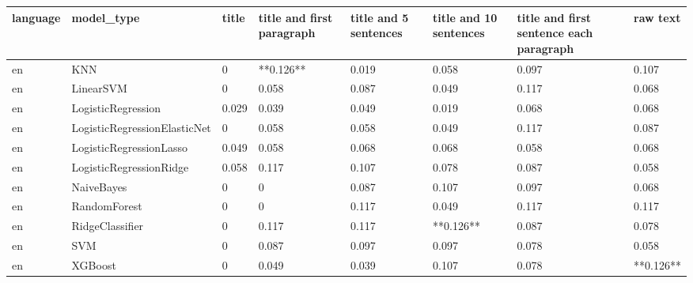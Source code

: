 \begin{tabular}{llllllll}
\toprule
language &                   model\_type & title & title and first paragraph & title and 5 sentences & title and 10 sentences & title and first sentence each paragraph &  raw text \\
\midrule
      en &                          KNN &     0 &                 **0.126** &                 0.019 &                  0.058 &                                   0.097 &     0.107 \\
      en &                    LinearSVM &     0 &                     0.058 &                 0.087 &                  0.049 &                                   0.117 &     0.068 \\
      en &           LogisticRegression & 0.029 &                     0.039 &                 0.049 &                  0.019 &                                   0.068 &     0.068 \\
      en & LogisticRegressionElasticNet &     0 &                     0.058 &                 0.058 &                  0.049 &                                   0.117 &     0.087 \\
      en &      LogisticRegressionLasso & 0.049 &                     0.058 &                 0.068 &                  0.068 &                                   0.058 &     0.068 \\
      en &      LogisticRegressionRidge & 0.058 &                     0.117 &                 0.107 &                  0.078 &                                   0.087 &     0.058 \\
      en &                   NaiveBayes &     0 &                         0 &                 0.087 &                  0.107 &                                   0.097 &     0.068 \\
      en &                 RandomForest &     0 &                         0 &                 0.117 &                  0.049 &                                   0.117 &     0.117 \\
      en &              RidgeClassifier &     0 &                     0.117 &                 0.117 &              **0.126** &                                   0.087 &     0.078 \\
      en &                          SVM &     0 &                     0.087 &                 0.097 &                  0.097 &                                   0.078 &     0.058 \\
      en &                      XGBoost &     0 &                     0.049 &                 0.039 &                  0.107 &                                   0.078 & **0.126** \\

\end{tabular}
